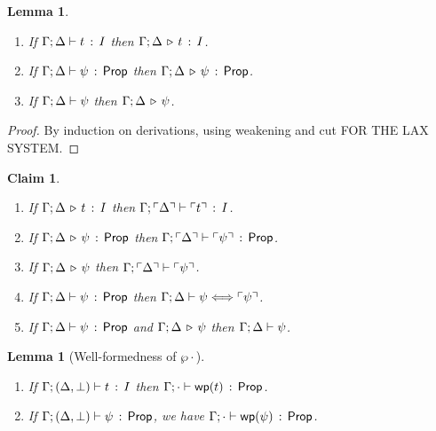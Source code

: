 \documentclass[10pt,a4paper]{article}
\newtheorem{lemma}[theorem]{Lemma}
\newtheorem{claim}[theorem]{Claim}
\begin{document}
\begin{lemma}
\mbox{}
\begin{enumerate}
  \item If $\Gamma;\Delta \vdash t\, :\, I$ then 
    $\Gamma;\Delta \,\triangleright\, t\, :\, I$.
  \item If $\Gamma;\Delta \vdash \psi\, :\, \mathsf{Prop}$ then
    $\Gamma;\Delta \,\triangleright\, \psi\,:\, \mathsf{Prop}$.
  \item If $\Gamma;\Delta \vdash \psi$ then
    $\Gamma;\Delta \,\triangleright\, \psi$.
\end{enumerate}
\end{lemma}

\begin{proof}
By induction on derivations, using weakening and cut FOR THE LAX SYSTEM.
\end{proof}

\begin{claim}
\mbox{}
\begin{enumerate}
  \item If $\Gamma;\Delta \,\triangleright\, t\, :\, I$ then
    $\Gamma;\ulcorner \Delta \urcorner \vdash \ulcorner t \urcorner\, :\, I$.
  \item If $\Gamma;\Delta \,\triangleright\, \psi\,:\, \mathsf{Prop}$ then
    $\Gamma;\ulcorner \Delta \urcorner \vdash \ulcorner \psi \urcorner\, :\, \mathsf{Prop}$.
  \item If $\Gamma;\Delta \,\triangleright\, \psi$ then
    $\Gamma;\ulcorner \Delta \urcorner \vdash \ulcorner \psi \urcorner$.
  \item If $\Gamma;\Delta \vdash \psi\, :\, \mathsf{Prop}$ then
    $\Gamma;\Delta \vdash \psi \Longleftrightarrow \ulcorner \psi \urcorner$.
  \item If $\Gamma;\Delta \vdash \psi\, :\, \mathsf{Prop}$ and $\Gamma;\Delta \,\triangleright\, \psi$ then
    $\Gamma;\Delta \vdash \psi$.
\end{enumerate}
\end{claim}

\begin{lemma}[Well-formedness of  $\wp{\cdot}$]
\mbox{}
  \begin{enumerate}
  \item If $\Gamma;(\Delta,\bot) \vdash t\, :\, I$ then
    $\Gamma;\cdot \vdash \mathop{\mathsf{wp}}(t)\, :\, \mathsf{Prop}$.
  \item If $\Gamma;(\Delta,\bot) \vdash \psi\, :\, \mathsf{Prop}$, we have
    $\Gamma;\cdot \vdash \mathop{\mathsf{wp}}(\psi)\, :\, \mathsf{Prop}$.
  \end{enumerate}
\end{lemma}
\end{document}
